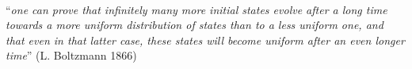 
\newpage{}
\quad\\[5.0cm]

\begin{flushright}
\begin{minipage}{8cm}
    \noindent
        \small
        ``\textit{one can prove that infinitely many more initial states evolve after a long time towards a more uniform distribution of states than to a less uniform one, and that even in that latter case, these states will become uniform after an even longer time}'' (L. Boltzmann 1866)\cite{boltzmann_uber_1866}\\[1.0cm]\\
        
\end{minipage}
\end{flushright}




